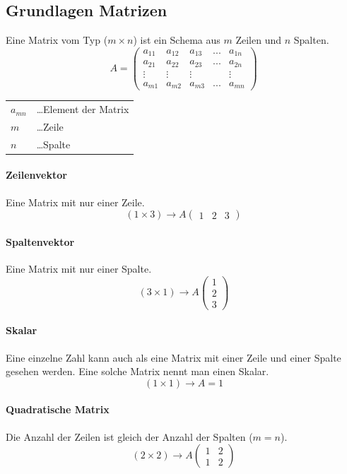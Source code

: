 \documentclass{school}
\begin{document}
\subsection{Grundlagen Matrizen}
Eine Matrix vom Typ ($m \times n$) ist ein Schema aus $m$ Zeilen und $n$ Spalten.
$$
A = \begin{pmatrix}
a_{11} & a_{12} & a_{13} & ... & a_{1n}\\
a_{21} & a_{22} & a_{23} & ... & a_{2n}\\
\vdots & \vdots & \vdots & & \vdots\\
a_{m1} & a_{m2} & a_{m3} & ... & a_{mn}
\end{pmatrix}
$$
\begin{center}
    \begin{tabular}{l l}
        $a_{mn}$ & \dots Element der Matrix \\
        $m$ & \dots Zeile\\
        $n$ & \dots Spalte
    \end{tabular}
\end{center}

\paragraph{Zeilenvektor}
Eine Matrix mit nur einer Zeile.
$$(1 \times 3) \to A\begin{pmatrix}1 & 2 & 3\end{pmatrix}$$

\paragraph{Spaltenvektor}
Eine Matrix mit nur einer Spalte.
$$(3 \times 1) \to A\begin{pmatrix}1\\2\\3\end{pmatrix}$$

\paragraph{Skalar}
Eine einzelne Zahl kann auch als eine Matrix mit einer Zeile und einer Spalte gesehen werden. Eine solche Matrix nennt man einen Skalar.
$$(1 \times 1) \to A = 1$$

\paragraph{Quadratische Matrix}
Die Anzahl der Zeilen ist gleich der Anzahl der Spalten ($m = n$).
$$(2 \times 2) \to A\begin{pmatrix}1 & 2\\1 & 2\end{pmatrix}$$
\end{document}
